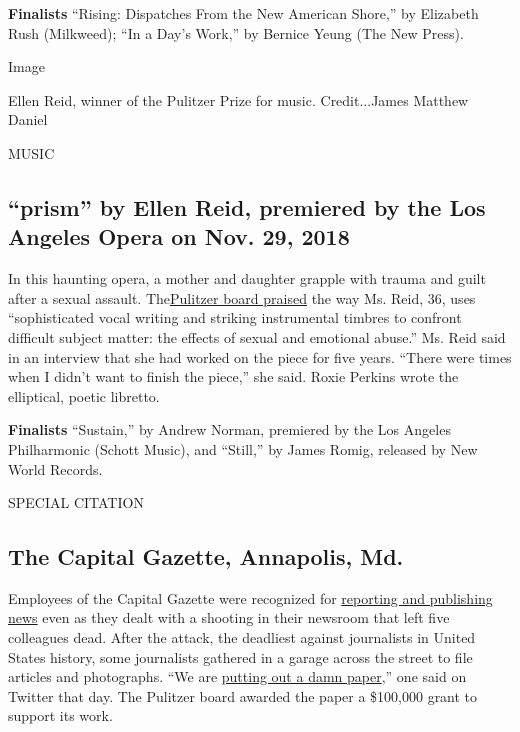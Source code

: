 \textbf{Finalists} ``Rising: Dispatches From the New American Shore,''
by Elizabeth Rush (Milkweed); ``In a Day's Work,'' by Bernice Yeung (The
New Press).

Image

Ellen Reid, winner of the Pulitzer Prize for music. Credit...James
Matthew Daniel

MUSIC

\hypertarget{prism-by-ellen-reid-premiered-by-the-los-angeles-opera-on-nov-29-2018}{%
\subsection{``prism'' by Ellen Reid, premiered by the Los Angeles Opera
on Nov. 29,
2018}\label{prism-by-ellen-reid-premiered-by-the-los-angeles-opera-on-nov-29-2018}}

In this haunting opera, a mother and daughter grapple with trauma and
guilt after a sexual assault.
The\href{https://www.pulitzer.org/winners/ellen-reid}{Pulitzer board
praised} the way Ms. Reid, 36, uses ``sophisticated vocal writing and
striking instrumental timbres to confront difficult subject matter: the
effects of sexual and emotional abuse.'' Ms. Reid said in an interview
that she had worked on the piece for five years. ``There were times when
I didn't want to finish the piece,'' she said. Roxie Perkins wrote the
elliptical, poetic libretto.

\textbf{Finalists} ``Sustain,'' by Andrew Norman, premiered by the Los
Angeles Philharmonic (Schott Music), and ``Still,'' by James Romig,
released by New World Records.

SPECIAL CITATION

\hypertarget{the-capital-gazette-annapolis-md}{%
\subsection{The Capital Gazette, Annapolis,
Md.}\label{the-capital-gazette-annapolis-md}}

Employees of the Capital Gazette were recognized for
\href{https://www.capitalgazette.com/news/annapolis/bs-md-gazette-shooting-20180628-story.html}{reporting
and publishing news} even as they dealt with a shooting in their
newsroom that left five colleagues dead. After the attack, the deadliest
against journalists in United States history, some journalists gathered
in a garage across the street to file articles and photographs. ``We are
\href{https://twitter.com/chaseacook/status/1012465236195061766}{putting
out a damn paper},'' one said on Twitter that day. The Pulitzer board
awarded the paper a \$100,000 grant to support its work.

